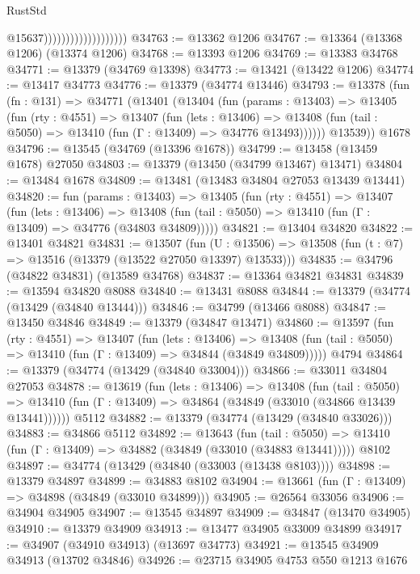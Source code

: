 \begin{lexlean}{RustStd}
\begin{coremodule}
                                          @15637)))))))))))))))))))
@34763 := @13362 @1206
@34767 := @13364 (@13368 @1206) (@13374 @1206)
@34768 := @13393 @1206
@34769 := @13383 @34768
@34771 := @13379 (@34769 @13398)
@34773 := @13421 (@13422 @1206)
@34774 := @13417 @34773
@34776 := @13379 (@34774 @13446)
@34793 := @13378
    (fun (fn : @131) =>
    @34771
      (@13401
        (@13404
          (fun (params : @13403) =>
          @13405
            (fun (rty : @4551) =>
            @13407
              (fun (lets : @13406) =>
              @13408 (fun (tail : @5050) => @13410 (fun (Γ : @13409) => @34776 @13493))))))
        @13539))
    @1678
@34796 := @13545 (@34769 (@13396 @1678))
@34799 := @13458 (@13459 @1678) @27050
@34803 := @13379 (@13450 (@34799 @13467) @13471)
@34804 := @13484 @1678
@34809 := @13481 (@13483 @34804 @27053 @13439 @13441)
@34820 := fun (params : @13403) =>
  @13405
    (fun (rty : @4551) =>
    @13407
      (fun (lets : @13406) =>
      @13408 (fun (tail : @5050) => @13410 (fun (Γ : @13409) => @34776 (@34803 @34809)))))
@34821 := @13404 @34820
@34822 := @13401 @34821
@34831 := @13507
    (fun (U : @13506) => @13508 (fun (t : @7) => @13516 (@13379 (@13522 @27050 @13397) @13533)))
@34835 := @34796 (@34822 @34831) (@13589 @34768)
@34837 := @13364 @34821 @34831
@34839 := @13594 @34820 @8088
@34840 := @13431 @8088
@34844 := @13379 (@34774 (@13429 (@34840 @13444)))
@34846 := @34799 (@13466 @8088)
@34847 := @13450 @34846
@34849 := @13379 (@34847 @13471)
@34860 := @13597
    (fun (rty : @4551) =>
    @13407
      (fun (lets : @13406) =>
      @13408 (fun (tail : @5050) => @13410 (fun (Γ : @13409) => @34844 (@34849 @34809)))))
    @4794
@34864 := @13379 (@34774 (@13429 (@34840 @33004)))
@34866 := @33011 @34804 @27053
@34878 := @13619
    (fun (lets : @13406) =>
    @13408
      (fun (tail : @5050) =>
      @13410 (fun (Γ : @13409) => @34864 (@34849 (@33010 (@34866 @13439 @13441))))))
    @5112
@34882 := @13379 (@34774 (@13429 (@34840 @33026)))
@34883 := @34866 @5112
@34892 := @13643
    (fun (tail : @5050) => @13410 (fun (Γ : @13409) => @34882 (@34849 (@33010 (@34883 @13441)))))
    @8102
@34897 := @34774 (@13429 (@34840 (@33003 (@13438 @8103))))
@34898 := @13379 @34897
@34899 := @34883 @8102
@34904 := @13661 (fun (Γ : @13409) => @34898 (@34849 (@33010 @34899)))
@34905 := @26564 @33056
@34906 := @34904 @34905
@34907 := @13545 @34897
@34909 := @34847 (@13470 @34905)
@34910 := @13379 @34909
@34913 := @13477 @34905 @33009 @34899
@34917 := @34907 (@34910 @34913) (@13697 @34773)
@34921 := @13545 @34909 @34913 (@13702 @34846)
@34926 := @23715 @34905 @4753 @550 @1213 @1676

\end{coremodule}
\end{lexlean}
